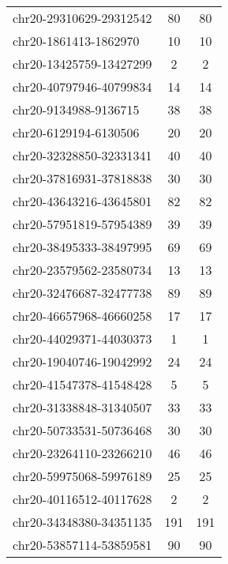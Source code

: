 \begin{longtable}{lSS}
	chr20-29310629-29312542 & 80   & 80                              \\
	chr20-1861413-1862970   & 10   & 10                              \\
	chr20-13425759-13427299 & 2    & 2                               \\
	chr20-40797946-40799834 & 14   & 14                              \\
	chr20-9134988-9136715   & 38   & 38                              \\
	chr20-6129194-6130506   & 20   & 20                              \\
	chr20-32328850-32331341 & 40   & 40                              \\
	chr20-37816931-37818838 & 30   & 30                              \\
	chr20-43643216-43645801 & 82   & 82                              \\
	chr20-57951819-57954389 & 39   & 39                              \\
	chr20-38495333-38497995 & 69   & 69                              \\
	chr20-23579562-23580734 & 13   & 13                              \\
	chr20-32476687-32477738 & 89   & 89                              \\
	chr20-46657968-46660258 & 17   & 17                              \\
	chr20-44029371-44030373 & 1    & 1                               \\
	chr20-19040746-19042992 & 24   & 24                              \\
	chr20-41547378-41548428 & 5    & 5                               \\
	chr20-31338848-31340507 & 33   & 33                              \\
	chr20-50733531-50736468 & 30   & 30                              \\
	chr20-23264110-23266210 & 46   & 46                              \\
	chr20-59975068-59976189 & 25   & 25                              \\
	chr20-40116512-40117628 & 2    & 2                               \\
	chr20-34348380-34351135 & 191  & 191                             \\
	chr20-53857114-53859581 & 90   & 90                              \\

\end{longtable}
